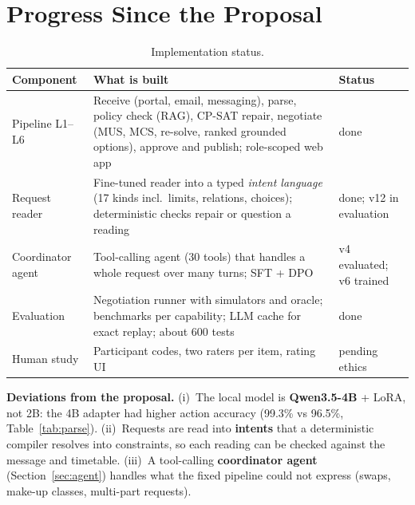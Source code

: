\documentclass[11pt,a4paper]{article}
\begin{document}
\section{Progress Since the Proposal}
\begin{table}[H]
\centering\small
\begin{tabularx}{\textwidth}{@{}L{3.2cm} Y L{2.6cm}@{}}
\toprule
\textbf{Component} & \textbf{What is built} & \textbf{Status}\\
\midrule
Pipeline L1--L6 & Receive (portal, email, messaging), parse, policy check (RAG), CP-SAT repair, negotiate (MUS, MCS, re-solve, ranked grounded options), approve and publish; role-scoped web app & done\\
Request reader & Fine-tuned reader into a typed \emph{intent language} (17 kinds incl.\ limits, relations, choices); deterministic checks repair or question a reading & done; v12 in evaluation\\
Coordinator agent & Tool-calling agent (30 tools) that handles a whole request over many turns; SFT + DPO & v4 evaluated; v6 trained\\
Evaluation & Negotiation runner with simulators and oracle; benchmarks per capability; LLM cache for exact replay; about 600 tests & done\\
Human study & Participant codes, two raters per item, rating UI & pending ethics\\
\bottomrule
\end{tabularx}
\caption{Implementation status.}
\end{table}

\noindent\textbf{Deviations from the proposal.} (i)~The local model is
\textbf{Qwen3.5-4B} + LoRA, not 2B: the 4B adapter had higher action accuracy
(99.3\% vs 96.5\%, Table~\ref{tab:parse}). (ii)~Requests are read into
\textbf{intents} that a deterministic compiler resolves into constraints, so each
reading can be checked against the message and timetable. (iii)~A tool-calling
\textbf{coordinator agent} (Section~\ref{sec:agent}) handles what the fixed pipeline
could not express (swaps, make-up classes, multi-part requests).

\end{document}
